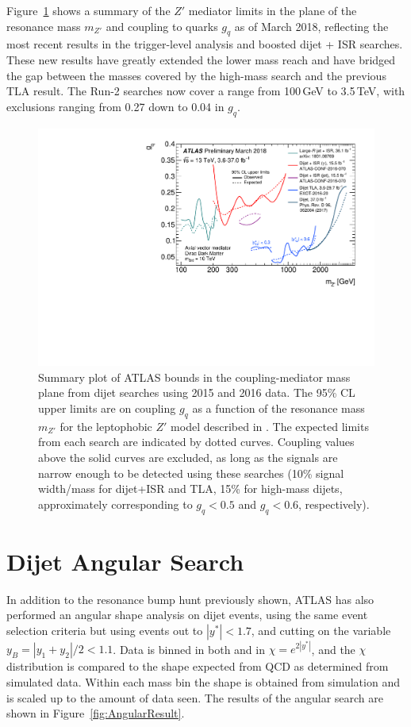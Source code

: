 Figure~\ref{fig:DMCouplings} shows a summary of the $Z'$ mediator limits in the plane of the resonance mass $m_{Z'}$ and coupling to quarks $g_q$ as of March 2018, reflecting the most recent results in the trigger-level analysis and boosted dijet + ISR searches.  These new results have greatly extended the lower mass reach and have bridged the gap between the masses covered by the high-mass search and the previous TLA result.  The Run-2 searches now cover a range from 100\,GeV to 3.5\,TeV, with exclusions ranging from 0.27 down to 0.04 in $g_q$.

\begin{figure}[]
	\centering
	\includegraphics[width=\columnwidth]{figures/Conclusion/DMCouplings.pdf}
	\caption{Summary plot of ATLAS bounds in the coupling-mediator mass plane from dijet searches using 2015 and 2016 data. The 95\% CL upper limits are on coupling $g_q$ as a function of the resonance mass $m_{Z'}$ for the leptophobic $Z'$ model described in \cite{DMForum}. The expected limits from each search are indicated by dotted curves. Coupling values above the solid curves are excluded, as long as the signals are narrow enough to be detected using these searches (10\% signal width/mass for dijet+ISR and TLA, 15\% for high-mass dijets, approximately corresponding to $g_q < 0.5$ and $g_q < 0.6$, respectively).}
	\label{fig:DMCouplings}
\end{figure}

\section{Dijet Angular Search}

In addition to the resonance bump hunt previously shown, ATLAS has also performed an angular shape analysis on dijet events, using the same event selection criteria but using events out to $|y^*|<1.7$, and cutting on the variable $y_B = |y_1+y_2|/2 < 1.1$.  Data is binned in both \mjj and in $\chi = e^{2|y^*|}$, and the $\chi$ distribution is compared to the shape expected from QCD as determined from simulated data.  Within each mass bin the shape is obtained from simulation and is scaled up to the amount of data seen.  The results of the angular search are shown in Figure~\ref{fig:AngularResult}.


